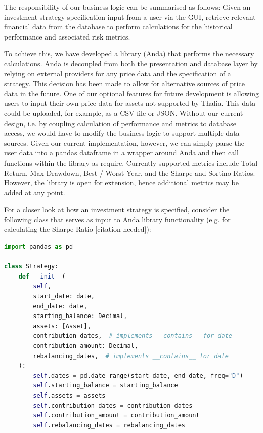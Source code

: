 \documentclass[main.tex]{subfiles}
\begin{document}
The responsibility of our business logic can be summarised as follows: Given an investment strategy specification input from a user via the GUI, retrieve relevant financial data from the database to perform calculations for the historical performance and associated risk metrics.

To achieve this, we have developed a library (Anda) that performs the necessary calculations. Anda is decoupled from both the presentation and database layer by relying on external providers for any price data and the specification of a strategy.
This decision has been made to allow for alternative sources of price data in the future. One of our optional features for future development is allowing users to input their own price data for assets not supported by Thalia. This data could be uploaded, for example, as a CSV file or JSON. Without our current design, i.e. by coupling calculation of performance and metrics to database access, we would have to modify the business logic to support multiple data sources. Given our current implementation, however, we can simply parse the user data into a pandas dataframe in a wrapper around Anda and then call functions within the library as require.
Currently supported metrics include Total Return, Max Drawdown, Best / Worst Year, and the Sharpe and Sortino Ratios. However, the library is open for extension, hence additional metrics may be added at any point.

For a closer look at how an investment strategy is specified, consider the following class that serves as input to Anda library functionality (e.g. for calculating the Sharpe Ratio [citation needed]):

\begin{lstlisting}[language=Python, caption=setup.py - Development environment, label=lst:Development_env]
import pandas as pd

class Strategy:
    def __init__(
        self,
        start_date: date,
        end_date: date,
        starting_balance: Decimal,
        assets: [Asset],
        contribution_dates,  # implements __contains__ for date
        contribution_amount: Decimal,
        rebalancing_dates,  # implements __contains__ for date
    ):
        self.dates = pd.date_range(start_date, end_date, freq="D")
        self.starting_balance = starting_balance
        self.assets = assets
        self.contribution_dates = contribution_dates
        self.contribution_amount = contribution_amount
        self.rebalancing_dates = rebalancing_dates
\end{lstlisting}
\end{document}
